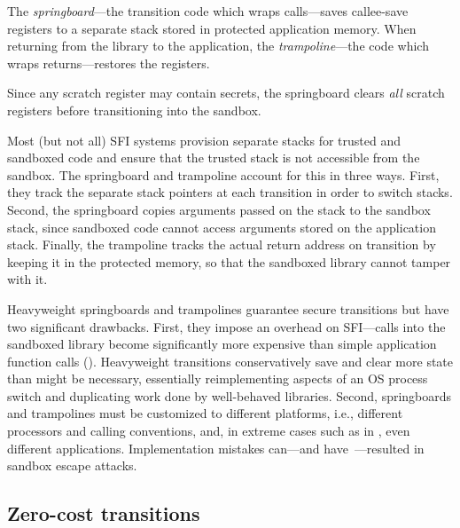 %
The \emph{springboard}\dash---the transition code which wraps calls\dash---saves
callee-save registers to a separate stack stored in protected application
memory.
%
When returning from the library to the application,
the \emph{trampoline}\dash---the code which wraps returns\dash---restores the
registers.

%
Since any scratch register may contain secrets, the springboard clears
\emph{all} scratch registers before transitioning into the sandbox.

Most (but not all) SFI systems provision separate stacks for trusted and
sandboxed code and ensure that the trusted stack is not accessible from the
sandbox.
%
The springboard and trampoline account for this in three ways.
%
First, they track the separate stack pointers at each transition in order to
switch stacks.
%
Second, the springboard copies arguments passed on the stack to the sandbox
stack, since sandboxed code cannot access arguments stored on the
application stack.
%
Finally, the trampoline tracks the actual return address on transition by
keeping it in the protected memory, so that the sandboxed library cannot tamper
with it.

%
Heavyweight springboards and trampolines guarantee secure transitions
but have two significant drawbacks.
%
First, they impose an overhead on SFI\dash---calls into the sandboxed library become significantly more expensive than
simple application function calls  ().
%
Heavyweight transitions conservatively save and clear more state than might be necessary, essentially
reimplementing aspects of an OS process switch and duplicating work done by
well-behaved libraries.
%
Second, springboards and trampolines must be customized to different platforms,
i.e., different processors and calling conventions, and, in extreme cases such
as in \citet{vahldiek-oberwagner_erim_2019}, even different applications.
%
Implementation mistakes
can\dash---and have~\cite{nacl-bugs, nacl-bug-2919, nacl-bug-775, nacl-bug-1607,
nacl-bug-1633, bartel2018twenty}\dash---resulted in sandbox escape attacks.

\subsection{Zero-cost transitions}
\label{subsec:overview-zero}

